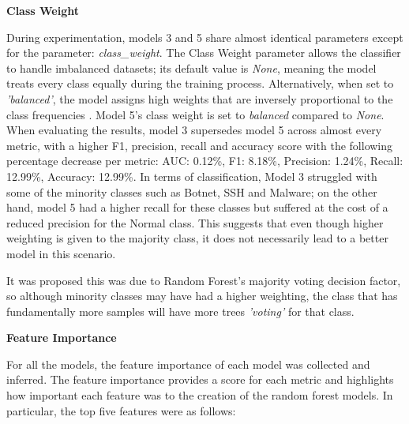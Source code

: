 \medskip
\textbf{Class Weight}

During experimentation, models 3 and 5 share almost identical parameters except for the parameter: \textit{class\_weight}. The Class Weight parameter allows the classifier to handle imbalanced datasets; its default value is \textit{None}, meaning the model treats every class equally during the training process. Alternatively, when set to \textit{'balanced'}, the model assigns high weights that are inversely proportional to the class frequencies \parencite{scikit-learn}. Model 5's class weight is set to \textit{balanced} compared to \textit{None}. When evaluating the results, model 3 supersedes model 5 across almost every metric, with a higher F1, precision, recall and accuracy score with the following percentage decrease per metric: AUC: 0.12\%, F1: 8.18\%, Precision: 1.24\%, Recall: 12.99\%, Accuracy: 12.99\%. In terms of classification, Model 3 struggled with some of the minority classes such as Botnet, SSH and Malware; on the other hand, model 5 had a higher recall for these classes but suffered at the cost of a reduced precision for the Normal class. This suggests that even though higher weighting is given to the majority class, it does not necessarily lead to a better model in this scenario.

It was proposed this was due to Random Forest's majority voting decision factor, so although minority classes may have had a higher weighting, the class that has fundamentally more samples will have more trees \textit{'voting'} for that class.


\medskip
\textbf{Feature Importance}

For all the models, the feature importance of each model was collected and inferred. The feature importance provides a score for each metric and highlights how important each feature was to the creation of the random forest models. In particular, the top five features were as follows:

